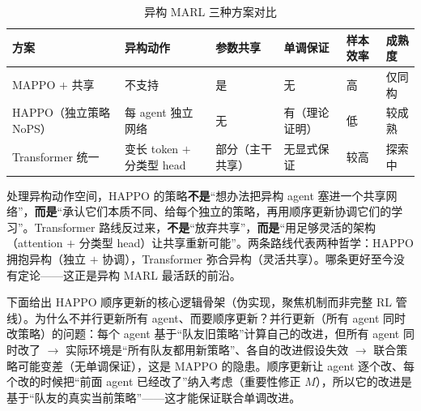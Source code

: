 \begin{table}[H]\centering\small
\caption{异构 MARL 三种方案对比}
\label{tab:hmr-marl-three}
\begin{tabular}{llllll}
\toprule
方案 & 异构动作 & 参数共享 & 单调保证 & 样本效率 & 成熟度 \\
\midrule
MAPPO $+$ 共享 & 不支持 & 是 & 无 & 高 & 仅同构 \\
HAPPO（独立策略 NoPS） & 每 agent 独立网络 & 无 & 有（理论证明） & 低 & 较成熟 \\
Transformer 统一 & 变长 token $+$ 分类型 head & 部分（主干共享） & 无显式保证 & 较高 & 探索中 \\
\bottomrule
\end{tabular}
\end{table}

\begin{insight}
处理异构动作空间，HAPPO 的策略\textbf{不是}“想办法把异构 agent 塞进一个共享网络”，\textbf{而是}“承认它们本质不同、给每个独立的策略，再用顺序更新协调它们的学习”。Transformer 路线反过来，\textbf{不是}“放弃共享”，\textbf{而是}“用足够灵活的架构（attention $+$ 分类型 head）让共享重新可能”。两条路线代表两种哲学：HAPPO 拥抱异构（独立 $+$ 协调），Transformer 弥合异构（灵活共享）。哪条更好至今没有定论——这正是异构 MARL 最活跃的前沿。
\end{insight}

\noindent 下面给出 HAPPO 顺序更新的核心逻辑骨架（伪实现，聚焦机制而非完整 RL 管线）。为什么不并行更新所有 agent、而要顺序更新？并行更新（所有 agent 同时改策略）的问题：每个 agent 基于“队友旧策略”计算自己的改进，但所有 agent 同时改了 $\to$ 实际环境是“所有队友都用新策略”、各自的改进假设失效 $\to$ 联合策略可能变差（无单调保证），这是 MAPPO 的隐患。顺序更新让 agent 逐个改、每个改的时候把“前面 agent 已经改了”纳入考虑（重要性修正 $M$），所以它的改进是基于“队友的真实当前策略”——这才能保证联合单调改进。

